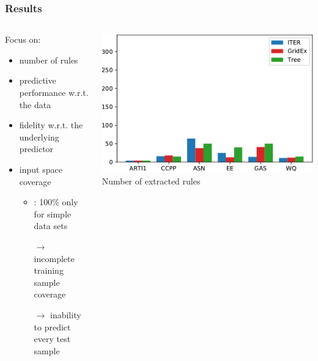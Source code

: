 \documentclass[presentation]{beamer}
\begin{document}
\begin{frame}%
	\frametitle{Results}
	
	\begin{columns}
		\begin{column}{0.5\linewidth}
			Focus on:
			\begin{itemize}
				\item number of rules
				\item predictive performance w.r.t. the data
				\item fidelity w.r.t. the underlying predictor
				\item input space coverage
				\begin{itemize}
					\item \iter: 100\% only for simple data sets
					\item[$\rightarrow$] incomplete training sample coverage
					\item[$\rightarrow$] inability to predict every test sample
				\end{itemize}
			\end{itemize}
		\end{column}
		\begin{column}{0.5\linewidth}
			\centering
			\includegraphics[width=\columnwidth]{img/comp/rules.pdf}
			\\
			\scriptsize Number of extracted rules
		\end{column}		
	\end{columns}	
\end{frame}
\end{document}

